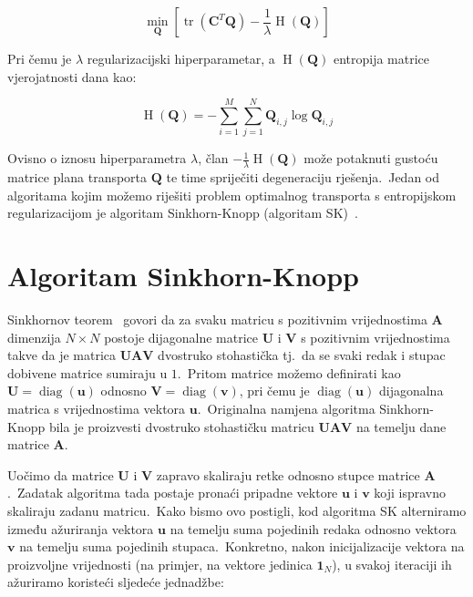 \documentclass[diplomskirad]{fer}
\begin{document}
\begin{equation}
  \min_{\bm{Q}} \left[ \operatorname{tr}(\bm{C}^T \bm{Q}) - \frac{1}{\lambda} \operatorname{H}(\bm{Q}) \right]
  \label{eq:ot_with_entropy}
\end{equation}

Pri čemu je $\lambda$ regularizacijski hiperparametar, a $\operatorname{H}(\bm{Q})$ entropija matrice vjerojatnosti dana kao:

\begin{equation}
  \operatorname{H}(\bm{Q}) = -\sum_{i = 1}^{M} \sum_{j = 1}^{N} \bm{Q}_{i,j} \log \bm{Q}_{i,j}
  \label{eq:ot_with_entropy}
\end{equation}

Ovisno o iznosu hiperparametra $\lambda$, član $- \frac{1}{\lambda} \operatorname{H}(\bm{Q})$ može potaknuti gustoću matrice plana transporta $\bm{Q}$ te time spriječiti degeneraciju rješenja.\
Jedan od algoritama kojim možemo riješiti problem optimalnog transporta s entropijskom regularizacijom je algoritam Sinkhorn-Knopp (algoritam SK)~\cite{knight2008sinkhorn}.\ 

\section{Algoritam Sinkhorn-Knopp}
\label{sek:sk_alg}

Sinkhornov teorem~\cite{sinkhorn1964relationship} govori da za svaku matricu s pozitivnim vrijednostima $\bm{A}$ dimenzija $N \times N$ postoje dijagonalne matrice $\bm{U}$ i $\bm{V}$ s pozitivnim vrijednostima takve da je matrica $\bm{U} \bm{A} \bm{V}$ dvostruko stohastička tj.\ da se svaki redak i stupac dobivene matrice sumiraju u $1$.\ 
Pritom matrice možemo definirati kao $\bm{U} = \operatorname{diag}(\bm{u})$ odnosno $\bm{V} = \operatorname{diag}(\bm{v})$, pri čemu je $\operatorname{diag}(\bm{u})$ dijagonalna matrica s vrijednostima vektora $\bm{u}$.\ 
Originalna namjena algoritma Sinkhorn-Knopp bila je proizvesti dvostruko stohastičku matricu $\bm{U} \bm{A} \bm{V}$ na temelju dane matrice $\bm{A}$.\ 
  
Uočimo da matrice $\bm{U}$ i $\bm{V}$ zapravo skaliraju retke odnosno stupce matrice $\bm{A}$.\ Zadatak algoritma tada postaje pronaći pripadne vektore $\bm{u}$ i $\bm{v}$ koji ispravno skaliraju zadanu matricu.\ 
Kako bismo ovo postigli, kod algoritma SK alterniramo između ažuriranja vektora $\bm{u}$ na temelju suma pojedinih redaka odnosno vektora $\bm{v}$ na temelju suma pojedinih stupaca.\
Konkretno, nakon inicijalizacije vektora na proizvoljne vrijednosti (na primjer, na vektore jedinica $\bm{1}_N$), u svakoj iteraciji ih ažuriramo koristeći sljedeće jednadžbe:
\end{document}
